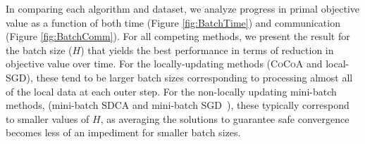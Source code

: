 \documentclass{article} %
\newcommand{\algname}{\textsc{CoCoA}\xspace}  %
\begin{document}
In comparing each algorithm and dataset, we analyze progress in
primal objective value as a function of both time (Figure \ref{fig:BatchTime})
and communication (Figure \ref{fig:BatchComm}). For all competing methods,
we present the result for the batch size ($H$) that yields the best performance
in terms of reduction in objective value over time. For the
locally-updating methods (\algname and local-SGD), these tend to be
larger batch sizes corresponding to processing almost all of the
local data at each outer step. For the non-locally updating mini-batch
methods, (mini-batch SDCA \cite{Takac:2013ut} and mini-batch 
SGD~\cite{ShalevShwartz:2010cg}), these typically correspond to smaller
values of $H$, as averaging the solutions to guarantee safe convergence
becomes less of an impediment for smaller batch sizes.
\end{document}
